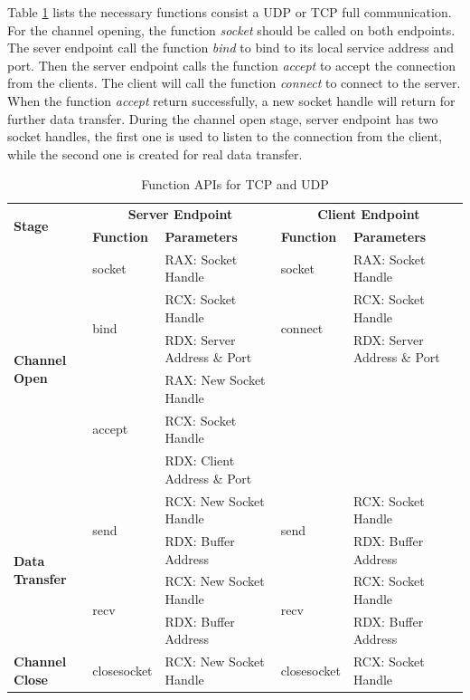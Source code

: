 Table \ref{tcpupdfunctions} lists the necessary functions consist a UDP or TCP full communication. For the channel opening, the function \textit{socket} should be called on both endpoints. The sever endpoint call the function \textit{bind} to bind to its local service address and port. Then the server endpoint calls the function  \textit{accept} to accept the connection from the clients. The client will call the function \textit{connect} to connect to the server. When the function \textit{accept} return successfully, a new socket handle will return for further data transfer. During the channel open stage, server endpoint has two socket handles, the first one is used to listen to the connection from the client, while the second one is created for real data transfer.
     \begin{table}[H]
        \centering
        \caption{Function APIs for TCP and UDP}
        \label{tcpupdfunctions}
        \begin{tabular}{|l|l|l|l|l|}
            \hline
             \multirow{2}{*}{\textbf{Stage}} &
               \multicolumn{2}{c|}{\textbf{Server Endpoint}} &
               \multicolumn{2}{c|}{\textbf{Client Endpoint}} \\
             \cline{2-5}
              & \textbf{Function}& \textbf{Parameters} & \textbf{Function} & \textbf{Parameters}  \\
             \hline
             \multirow{6}{*}{{\textbf{Channel Open}}}
             &socket&  RAX: Socket Handle & socket &  RAX: Socket Handle\\
              \cline{2-5}
              &\multirow{2}{*}{{bind}} &  RCX: Socket Handle & \multirow{2}{*}{connect} &  RCX: Socket Handle\\
              \cline{3-3} \cline{5-5}
             &&  RDX: Server Address $\&$ Port &  &  RDX: Server Address $\&$ Port\\
              \cline{2-5}
             &\multirow{3}{*}{{accept}} &  RAX: New Socket Handle && \\
              \cline{3-3} 
             &&  RCX:  Socket Handle &  & \\
             \cline{3-3} 
             &&  RDX: Client Address $\&$ Port &  &  \\
            \hline
             \multirow{4}{*}{{\textbf{Data Transfer}}}
             &\multirow{2}{*}{send} &  RCX: New Socket Handle & \multirow{2}{*}{send} &  RCX: Socket Handle\\
              \cline{3-3} \cline{5-5}
             &&  RDX: Buffer Address &  &  RDX: Buffer Address\\
            \cline{2-5}
             & \multirow{2}{*}{recv}&  RCX: New Socket Handle & \multirow{2}{*}{recv} &  RCX: Socket Handle\\
              \cline{3-3} \cline{5-5}
              &&  RDX: Buffer Address &  &  RDX: Buffer Address\\
            \hline
          {{\textbf{Channel Close}}}&
            {closesocket} & {RCX: New Socket Handle} &{closesocket} & {RCX: Socket Handle}\\
            \hline
        \end{tabular}
    \end{table} 
    

